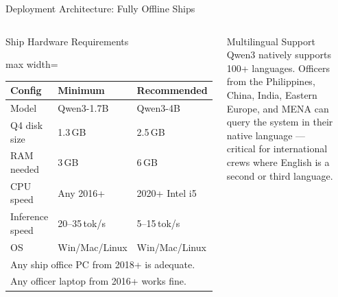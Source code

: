 \documentclass[aspectratio=169,11pt]{beamer}
\begin{document}
\begin{frame}[shrink=15]{Deployment Architecture: Fully Offline Ships}
\begin{columns}[T]

\begin{block}{Ship Hardware Requirements}
  \scriptsize
  \begin{adjustbox}{max width=\linewidth}
  \begin{tabular}{@{}lll@{}}
    \toprule
    \textbf{Config} & \textbf{Minimum} & \textbf{Recommended}\\
    \midrule
    Model & Qwen3-1.7B & Qwen3-4B\\
    Q4 disk size & 1.3\,GB & 2.5\,GB\\
    RAM needed & 3\,GB & 6\,GB\\
    CPU speed & Any 2016+ & 2020+ Intel i5\\
    Inference speed & 20--35\,tok/s & 5--15\,tok/s\\
    OS & Win/Mac/Linux & Win/Mac/Linux\\
    \midrule
    \multicolumn{3}{l}{Any ship office PC from 2018+ is adequate.}\\
    \multicolumn{3}{l}{Any officer laptop from 2016+ works fine.}\\
    \bottomrule
  \end{tabular}
  \end{adjustbox}
\end{block}

\begin{block}{Multilingual Support}
  \scriptsize\RaggedRight
  Qwen3 natively supports 100+ languages.  Officers from the Philippines,
  China, India, Eastern Europe, and MENA can query the system in their
  native language --- critical for international crews where English
  is a second or third language.
\end{block}

\begin{center}
\end{center}
\end{columns}
\end{frame}
\end{document}
